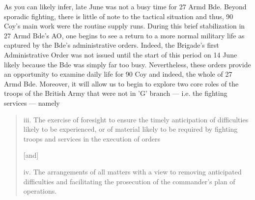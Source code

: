 \documentclass[noraggedright]{turabian-researchpaper}
\begin{document}



As you can likely infer, late June was not a busy time for 27
Armd Bde.  Beyond sporadic fighting, there is little of note to the tactical
situation and thus, 90 Coy's main work were the routine supply runs. 
During this brief stabilization in 27 Armd Bde's AO, one begins to see a 
return to a more normal military life as captured by the Bde's administrative 
orders.\autocite[See end of June diaries]{27wd} Indeed, the Brigade's first 
Administrative Order was not issued until the start of this period on 14 June 
likely because the Bde was simply far too busy.  Nevertheless, these orders 
provide an opportunity to examine daily life for 90 Coy and indeed, the whole 
of 27 Armd Bde.  Moreover, it will allow us to begin to explore two core 
roles of the troops of the British Army that were not in 'G' branch --- 
i.e. the fighting services --- namely \begin{quote}

	iii. The exercise of foresight to ensure the timely anticipation of
	difficulties likely to be experienced, or of material likely to be
	required by fighting troops and services in the execution of orders

	[and]

	iv. The arrangements of all matters with a view to removing anticipated
	difficulties and facilitating the prosecution of the commander's
	plan of operations.\autocite[s. 13(iii -- iv)]{FSR1}
\end{quote}
\end{document}
